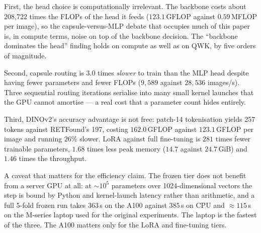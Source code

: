 \documentclass[journal]{IEEEtran}
\begin{document}
First, the head choice is computationally irrelevant. The backbone costs about 208{,}722 times the FLOPs of the head it feeds ($123.1$\,GFLOP against $0.59$\,MFLOP per image), so the capsule-versus-MLP debate that occupies much of this paper is, in compute terms, noise on top of the backbone decision. The ``backbone dominates the head'' finding holds on compute as well as on QWK, by five orders of magnitude.

Second, capsule routing is $3.0$ times \emph{slower} to train than the MLP head despite having fewer parameters and fewer FLOPs ($9{,}589$ against $28{,}536$ images/s). Three sequential routing iterations serialise into many small kernel launches that the GPU cannot amortise --- a real cost that a parameter count hides entirely.

Third, DINOv2's accuracy advantage is not free: patch-14 tokenisation yields 257 tokens against RETFound's 197, costing $162.0$\,GFLOP against $123.1$\,GFLOP per image and running $26$\% slower. LoRA against full fine-tuning is $281$ times fewer trainable parameters, $1.68$ times less peak memory ($14.7$ against $24.7$\,GiB) and $1.46$ times the throughput.

A caveat that matters for the efficiency claim. The frozen tier does not benefit from a server GPU at all: at $\sim\!10^5$ parameters over 1024-dimensional vectors the step is bound by Python and kernel-launch latency rather than arithmetic, and a full 5-fold frozen run takes $363$\,s on the A100 against $385$\,s on CPU and $\approx\!115$\,s on the M-series laptop used for the original experiments. The laptop is the fastest of the three. The A100 matters only for the LoRA and fine-tuning tiers.
\end{document}
